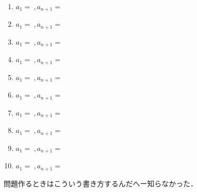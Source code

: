 \documentclass[platex,dvipdfmx]{jlreq}
\begin{document}
\begin{enumerate}[(1)   ]
  \\
  \item $a_1=\ ,a_{n+1}=$
  \\
  \item $a_1=\ ,a_{n+1}=$
  \\
  \item $a_1=\ ,a_{n+1}=$
  \\
  \item $a_1=\ ,a_{n+1}=$
  \\
  \item $a_1=\ ,a_{n+1}=$
  \\
  \item $a_1=\ ,a_{n+1}=$
  \\
  \item $a_1=\ ,a_{n+1}=$
  \\
  \item $a_1=\ ,a_{n+1}=$
  \\
  \item $a_1=\ ,a_{n+1}=$
  \\
  \item $a_1=\ ,a_{n+1}=$
  \\
\end{enumerate}
問題作るときはこういう書き方するんだへー知らなかった．
\end{document}
